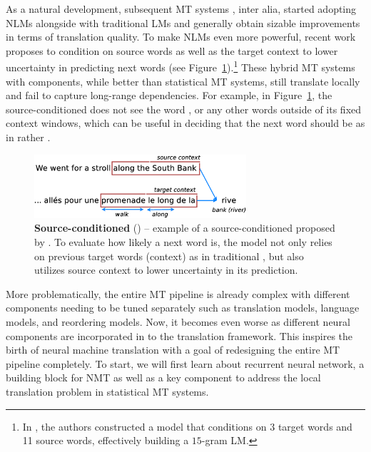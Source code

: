 {As a natural development, subsequent MT systems
\cite{schwenk07,vaswani13decode,luong15nlm}, inter alia, started adopting NLMs
alongside with traditional \ngram{} LMs and generally obtain sizable
improvements in terms of translation quality.
To make NLMs even more powerful, recent work
\cite{Schwenk12continuous,Son:2012:CST,Auli13,devlin14}
proposes to condition on source words as well as the target context to lower
uncertainty in predicting next words (see Figure~\ref{f:nnjm}).\footnote{In
\cite{devlin14}, the authors constructed a model that conditions on 3
target words and 11 source words, effectively building a $15$-gram LM.}
These hybrid MT systems with \nlm{} components, while better than statistical MT
systems, still translate locally and fail to capture long-range dependencies.
For example, in Figure~\ref{f:nnjm}, the
source-conditioned \nlm{} does not see the word , or any other words
outside of its fixed context windows, which can be useful in deciding that the
next word should be  as in  rather . 
\begin{figure}[tbh!]
\centering
\includegraphics[width=0.7\textwidth, clip=true, trim= 0 0 0 0]{img/nnjm.eps} %
\caption[Source-conditioned \nlmtext{}]{{\bf Source-conditioned \nlmtext{}}
(\nlms{}) -- example of a source-conditioned
\nlm{} proposed by . To evaluate how likely a next word
 is, the model not only relies on previous target words (context)
 as in
traditional \nlms{} \cite{Bengio2003}, but also utilizes source context  to lower uncertainty in its prediction.
} 
\label{f:nnjm}
\end{figure}

More problematically, the entire MT pipeline is already complex with
different components needing to be tuned separately such as translation models,
language models, and reordering models. Now, it becomes even worse as
different neural components are incorporated in to the translation framework.
This inspires the birth of neural machine
translation with a goal of redesigning the entire MT pipeline completely. To start, we will
first learn about recurrent neural network, a
building block for NMT as well as a key component to address the local
translation problem in statistical MT systems.
}

